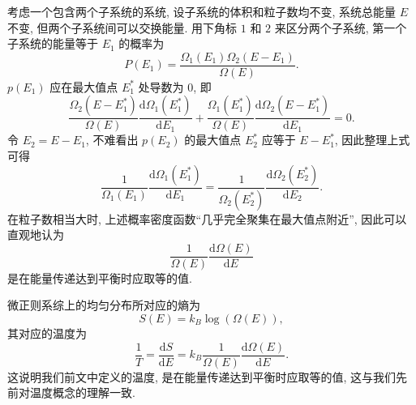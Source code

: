 考虑一个包含两个子系统的系统, 设子系统的体积和粒子数均不变, 系统总能量 $ E $ 不变, 但两个子系统间可以交换能量. 用下角标 $ 1 $ 和 $ 2 $ 来区分两个子系统, 第一个子系统的能量等于 $ E_1 $ 的概率为
\[ P(E_1)=\frac{\Omega_1(E_1)\Omega_2(E-E_1)}{\Omega(E)}. \]
$ p(E_1) $ 应在最大值点 $ E_1^* $ 处导数为 $ 0 $, 即
\[ \frac{\Omega_2(E-E_1^*)}{\Omega(E)}\frac{\mathrm{d}\Omega_1(E_1^*)}{\mathrm{d}E_1}+\frac{\Omega_1(E_1^*)}{\Omega(E)}\frac{\mathrm{d}\Omega_2(E-E_1^*)}{\mathrm{d}E_1}=0. \]
令 $ E_2=E-E_1 $, 不难看出 $ p(E_2) $ 的最大值点 $ E_2^* $ 应等于 $ E-E_1^* $, 因此整理上式可得
\[ \frac{1}{\Omega_1(E_1)}\frac{\mathrm{d}\Omega_1(E_1^*)}{\mathrm{d}E_1}=\frac{1}{\Omega_2(E_2^*)}\frac{\mathrm{d}\Omega_2(E_2^*)}{\mathrm{d}E_2}. \]
在粒子数相当大时, 上述概率密度函数``几乎完全聚集在最大值点附近'', 因此可以直观地认为
\[ \frac{1}{\Omega(E)}\frac{\mathrm{d}\Omega(E)}{\mathrm{d}E} \]
是在能量传递达到平衡时应取等的值. 

微正则系综上的均匀分布所对应的熵为
\[ S(E)=k_B\log(\Omega(E)), \]
其对应的温度为
\[ \frac{1}{T}=\frac{\mathrm{d}S}{\mathrm{d}E}=k_B\frac{1}{\Omega(E)}\frac{\mathrm{d}\Omega(E)}{\mathrm{d}E}. \]
这说明我们前文中定义的温度, 是在能量传递达到平衡时应取等的值, 这与我们先前对温度概念的理解一致.